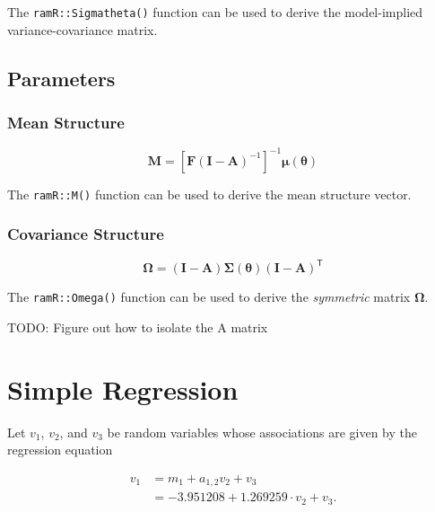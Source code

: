 \documentclass[
]{book}
\begin{document}
\noindent The \texttt{ramR::Sigmatheta()} function can be used
to derive the model-implied variance-covariance matrix.

\hypertarget{parameters}{%
\section{Parameters}\label{parameters}}

\hypertarget{mean-structure}{%
\subsection{Mean Structure}\label{mean-structure}}

\begin{equation}
  \mathbf{M}
  =
  \left[
    \mathbf{F}
    \left( \mathbf{I} - \mathbf{A} \right)^{-1}
  \right]^{-1}
  \boldsymbol{\mu} \left( \boldsymbol{\theta} \right)
\end{equation}

\noindent The \texttt{ramR::M()} function can be used
to derive the mean structure vector.

\hypertarget{covariance-structure}{%
\subsection{Covariance Structure}\label{covariance-structure}}

\begin{equation}
  \boldsymbol{\Omega}
  =
  \left( \mathbf{I} - \mathbf{A} \right)
  \boldsymbol{\Sigma} \left( \boldsymbol{\theta} \right)
  \left( \mathbf{I} - \mathbf{A} \right)^{\mathsf{T}}
\end{equation}

\noindent The \texttt{ramR::Omega()} function can be used
to derive the \emph{symmetric} matrix \(\boldsymbol{\Omega}\).

TODO: Figure out how to isolate the A matrix

\hypertarget{simple-regression}{%
\chapter{Simple Regression}\label{simple-regression}}

Let \(v_1\), \(v_2\), and \(v_3\) be random variables whose associations are given by the regression equation

\begin{equation}
  \begin{split}
    v_1
    &=
    m_1 + a_{1, 2} v_2 + v_3 \\
    &=
    -3.951208 + 1.269259 \cdot v_2 + v_3 .
  \end{split}
\end{equation}
\end{document}
